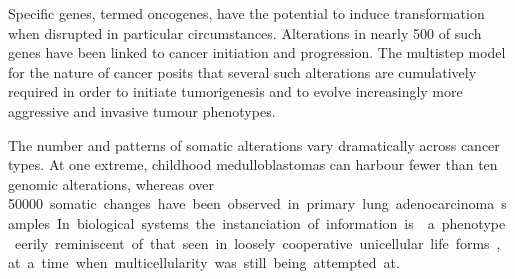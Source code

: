 \documentclass{tufte-book}
\begin{document}
Specific genes, termed oncogenes, have the potential to induce transformation
when disrupted in particular circumstances.  Alterations in nearly 500 of such
genes have been linked to cancer initiation and
progression.\cite{forbes_catalogue_2008} The multistep model for the nature of
cancer posits that several such alterations are cumulatively required in order
to initiate tumorigenesis and to evolve increasingly more aggressive and
invasive tumour phenotypes.\cite{vogelstein_multistep_1993}


The number and patterns of somatic alterations vary dramatically across cancer
types.  At one extreme, childhood medulloblastomas can harbour fewer than ten
genomic alterations, whereas over \SI{50000} somatic changes have been observed
in primary lung adenocarcinoma samples.

In biological systems the instanciation of information is .

a phenotype eerily reminiscent of that seen in loosely cooperative unicellular
life forms, at a time when multicellularity was still being attempted at.




\end{document}
